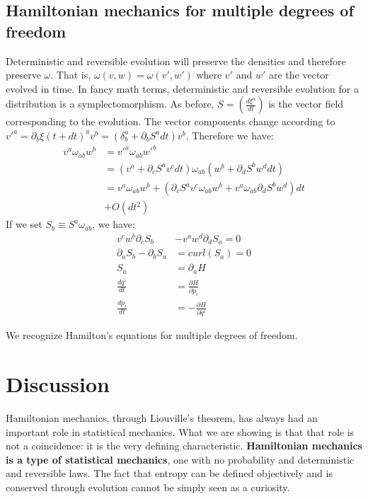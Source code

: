 \documentclass[11pt]{article}
\begin{document}
\subsection*{Hamiltonian mechanics for multiple degrees of freedom}

Deterministic and reversible evolution will preserve the densities and therefore preserve $\omega$. That is, $\omega(v, w) = \omega(v',w')$ where $v'$ and $w'$ are the vector evolved in time. In fancy math terms, deterministic and reversible evolution for a distribution is a symplectomorphism. As before, $S = \left(\frac{d\xi^a}{dt}\right)$ is the vector field corresponding to the evolution. The vector components change according to $v'^a = \partial_b \xi(t+dt)^a v^b = (\delta^a_b + \partial_b S^a dt) v^b$. Therefore we have:
\begin{align*}
v^{a} \omega_{ab} w^{b} &= v'^{a} \omega_{ab} w'^{b}  \\
&= (v^{a} + \partial_{c} S^{a} v^{c} dt) \omega_{ab} ( w^{b} + \partial_{d} S^{b} w^{d} dt) \\
&= v^{a} \omega_{ab} w^{b} + (\partial_{c} S^{a} v^{c} \omega_{ab} w^{b} + v^{a} \omega_{ab} \partial_{d} S^{b} w^{d}) dt \\ &+ O(dt^2)
\end{align*}
If we set $S_{b} \equiv S^{a} \omega_{ab}$, we have:
\begin{equation}
\begin{aligned}
v^{c} w^{b} \partial_{c} S_{b} &- v^{a} w^{d} \partial_{d} S_{a} = 0\\
\partial_{a} S_{b} - \partial_{b} S_{a} &= curl(S_{a}) = 0 \\
S_{a} &= \partial_{a}H \\
\frac{dq^i}{dt} &= \frac{\partial H}{\partial p_i}  \\
\frac{dp_i}{dt} &= - \frac{\partial H}{\partial q^i}
\end{aligned}
\end{equation}

We recognize Hamilton's equations for multiple degrees of freedom.

\section{Discussion}

Hamiltonian mechanics, through Liouville's theorem, has always had an important role in statistical mechanics. What we are showing is that that role is not a coincidence: it is the very defining characteristic. \textbf{Hamiltonian mechanics is a type of statistical mechanics}, one with no probability and deterministic and reversible laws. The fact that entropy can be defined objectively and is conserved through evolution cannot be simply seen as a curiosity.
\end{document}
